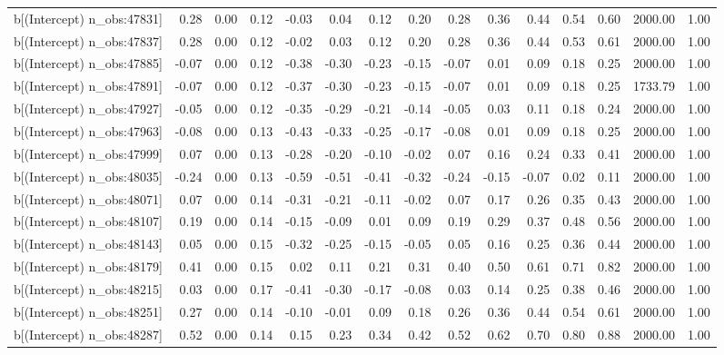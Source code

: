 \begin{table}[ht]
\begin{tabular}{rrrrrrrrrrrrrrr}
  b[(Intercept) n\_obs:47831] & 0.28 & 0.00 & 0.12 & -0.03 & 0.04 & 0.12 & 0.20 & 0.28 & 0.36 & 0.44 & 0.54 & 0.60 & 2000.00 & 1.00 \\ 
  b[(Intercept) n\_obs:47837] & 0.28 & 0.00 & 0.12 & -0.02 & 0.03 & 0.12 & 0.20 & 0.28 & 0.36 & 0.44 & 0.53 & 0.61 & 2000.00 & 1.00 \\ 
  b[(Intercept) n\_obs:47885] & -0.07 & 0.00 & 0.12 & -0.38 & -0.30 & -0.23 & -0.15 & -0.07 & 0.01 & 0.09 & 0.18 & 0.25 & 2000.00 & 1.00 \\ 
  b[(Intercept) n\_obs:47891] & -0.07 & 0.00 & 0.12 & -0.37 & -0.30 & -0.23 & -0.15 & -0.07 & 0.01 & 0.09 & 0.18 & 0.25 & 1733.79 & 1.00 \\ 
  b[(Intercept) n\_obs:47927] & -0.05 & 0.00 & 0.12 & -0.35 & -0.29 & -0.21 & -0.14 & -0.05 & 0.03 & 0.11 & 0.18 & 0.24 & 2000.00 & 1.00 \\ 
  b[(Intercept) n\_obs:47963] & -0.08 & 0.00 & 0.13 & -0.43 & -0.33 & -0.25 & -0.17 & -0.08 & 0.01 & 0.09 & 0.18 & 0.25 & 2000.00 & 1.00 \\ 
  b[(Intercept) n\_obs:47999] & 0.07 & 0.00 & 0.13 & -0.28 & -0.20 & -0.10 & -0.02 & 0.07 & 0.16 & 0.24 & 0.33 & 0.41 & 2000.00 & 1.00 \\ 
  b[(Intercept) n\_obs:48035] & -0.24 & 0.00 & 0.13 & -0.59 & -0.51 & -0.41 & -0.32 & -0.24 & -0.15 & -0.07 & 0.02 & 0.11 & 2000.00 & 1.00 \\ 
  b[(Intercept) n\_obs:48071] & 0.07 & 0.00 & 0.14 & -0.31 & -0.21 & -0.11 & -0.02 & 0.07 & 0.17 & 0.26 & 0.35 & 0.43 & 2000.00 & 1.00 \\ 
  b[(Intercept) n\_obs:48107] & 0.19 & 0.00 & 0.14 & -0.15 & -0.09 & 0.01 & 0.09 & 0.19 & 0.29 & 0.37 & 0.48 & 0.56 & 2000.00 & 1.00 \\ 
  b[(Intercept) n\_obs:48143] & 0.05 & 0.00 & 0.15 & -0.32 & -0.25 & -0.15 & -0.05 & 0.05 & 0.16 & 0.25 & 0.36 & 0.44 & 2000.00 & 1.00 \\ 
  b[(Intercept) n\_obs:48179] & 0.41 & 0.00 & 0.15 & 0.02 & 0.11 & 0.21 & 0.31 & 0.40 & 0.50 & 0.61 & 0.71 & 0.82 & 2000.00 & 1.00 \\ 
  b[(Intercept) n\_obs:48215] & 0.03 & 0.00 & 0.17 & -0.41 & -0.30 & -0.17 & -0.08 & 0.03 & 0.14 & 0.25 & 0.38 & 0.46 & 2000.00 & 1.00 \\ 
  b[(Intercept) n\_obs:48251] & 0.27 & 0.00 & 0.14 & -0.10 & -0.01 & 0.09 & 0.18 & 0.26 & 0.36 & 0.44 & 0.54 & 0.61 & 2000.00 & 1.00 \\ 
  b[(Intercept) n\_obs:48287] & 0.52 & 0.00 & 0.14 & 0.15 & 0.23 & 0.34 & 0.42 & 0.52 & 0.62 & 0.70 & 0.80 & 0.88 & 2000.00 & 1.00 \\ 

\end{tabular}
\end{table}
